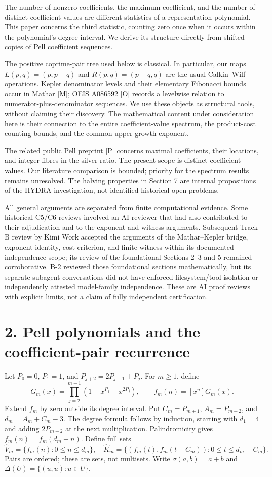 \documentclass[11pt]{article}
\begin{document}
The number of nonzero coefficients, the maximum coefficient, and the number of distinct coefficient values are different statistics of a representation polynomial. This paper concerns the third statistic, counting zero once when it occurs within the polynomial's degree interval. We derive its structure directly from shifted copies of Pell coefficient sequences.

The positive coprime-pair tree used below is classical. In particular, our maps \(L(p,q)=(p,p+q)\) and \(R(p,q)=(p+q,q)\) are the usual Calkin--Wilf operations. Kepler denominator levels and their elementary Fibonacci bounds occur in Mathar [M]; OEIS A086592 [O] records a levelwise relation to numerator-plus-denominator sequences. We use these objects as structural tools, without claiming their discovery. The mathematical content under consideration here is their connection to the entire coefficient-value spectrum, the product-cost counting bounds, and the common upper growth exponent.

The related public Pell preprint [P] concerns maximal coefficients, their locations, and integer fibres in the silver ratio. The present scope is distinct coefficient values. Our literature comparison is bounded; priority for the spectrum results remains unresolved. The halving properties in Section 7 are internal propositions of the HYDRA investigation, not identified historical open problems.

All general arguments are separated from finite computational evidence. Some historical C5/C6 reviews involved an AI reviewer that had also contributed to their adjudication and to the exponent and witness arguments. Subsequent Track B review by Kimi Work accepted the arguments of the Mathar--Kepler bridge, exponent identity, cost criterion, and finite witness within its documented independence scope; its review of the foundational Sections 2--3 and 5 remained corroborative. B-2 reviewed those foundational sections mathematically, but its separate subagent conversations did not have enforced filesystem/tool isolation or independently attested model-family independence. These are AI proof reviews with explicit limits, not a claim of fully independent certification.

\section*{2. Pell polynomials and the coefficient-pair recurrence}

Let \(P_0=0\), \(P_1=1\), and \(P_{j+2}=2P_{j+1}+P_j\). For \(m\ge1\), define
\[
G_m(x)=\prod_{j=2}^{m+1}(1+x^{P_j}+x^{2P_j}),\qquad f_m(n)=[x^n]G_m(x).
\]
Extend \(f_m\) by zero outside its degree interval. Put \(C_m=P_{m+1}\), \(A_m=P_{m+2}\), and \(d_m=A_m+C_m-3\). The degree formula follows by induction, starting with \(d_1=4\) and adding \(2P_{m+2}\) at the next multiplication. Palindromicity gives \(f_m(n)=f_m(d_m-n)\). Define full sets
\[
\widehat V_m=\{f_m(n):0\le n\le d_m\},\quad
\widehat K_m=\{(f_m(t),f_m(t+C_m)):0\le t\le d_m-C_m\}.
\]
Pairs are ordered; these are sets, not multisets. Write \(\sigma(a,b)=a+b\) and \(\Delta(U)=\{(u,u):u\in U\}\).
\end{document}
